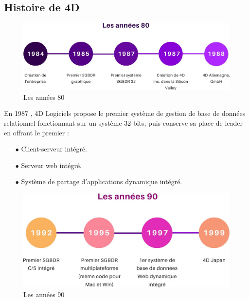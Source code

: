 
\subsection{Histoire de 4D}


\begin{figure}[h]
    \centering
    \includegraphics[scale=0.3]{Figures/80.jpg} %
    \caption{Les années 80 \cite{4Dhistory}}
    \label{fig:Histoire80}
\end{figure}


En 1987 , 4D Logiciels propose le premier système de gestion de base de données relationnel fonctionnant sur un système 32-bits, puis conserve sa place de leader en offrant le premier :
\begin{itemize}
    \item[$\bullet$]  Client-serveur intégré.
    \item[$\bullet$]  Serveur web intégré.
    \item[$\bullet$]  Système de partage d’applications dynamique intégré.
\end{itemize}
\vspace{1cm}

\begin{figure}[h]
    \centering
    \includegraphics[scale=0.3]{Figures/90.jpg} %
    \caption{Les années 90 \cite{4Dhistory}}
    \label{fig:Histoire90}
\end{figure}

